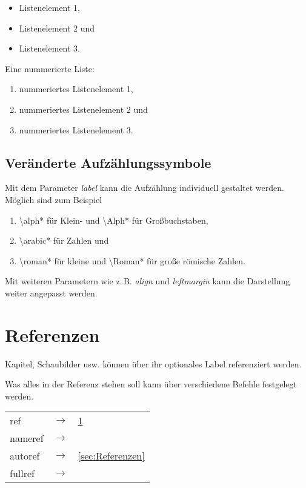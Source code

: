 \begin{itemize}
	\item Listenelement 1,
	\item Listenelement 2 und
	\item Listenelement 3.
\end{itemize}

Eine nummerierte Liste:

\begin{enumerate}
	\item nummeriertes Listenelement 1,
	\item nummeriertes Listenelement 2 und
	\item nummeriertes Listenelement 3.
\end{enumerate}

\subsection{Veränderte Aufzählungssymbole}
\label{sub:Veraenderte_Aufzaehlungssymbole}

Mit dem Parameter \emph{label} kann die Aufzählung individuell gestaltet werden.
Möglich sind zum Beispiel

\begin{enumerate}[label=\Roman*.)]
	\item \textbackslash{}alph* für Klein- und \textbackslash{}Alph* für Großbuchstaben,
	\item \textbackslash{}arabic* für Zahlen und
	\item \textbackslash{}roman* für kleine und \textbackslash{}Roman* für große römische Zahlen.
\end{enumerate}

Mit weiteren Parametern wie z.\,B. \emph{align} und \emph{leftmargin} kann die Darstellung weiter angepasst werden.

\section{Referenzen}
\label{sec:Referenzen}

Kapitel, Schaubilder usw. können über ihr optionales Label referenziert werden.

Was alles in der Referenz stehen soll kann über verschiedene Befehle festgelegt werden.

{ %
	\def\arraystretch{1.2}
	\begin{tabular}{@{}lcl@{}} %
		\normalsize ref & $\rightarrow$ & \normalsize\ref{sec:Referenzen} \\
		\normalsize nameref & $\rightarrow$ & \normalsize\nameref{sec:Referenzen} \\
		\normalsize autoref & $\rightarrow$ & \normalsize\autoref{sec:Referenzen} \\
		\normalsize fullref & $\rightarrow$ & \normalsize\fullref{sec:Referenzen} \\
	\end{tabular}
}


